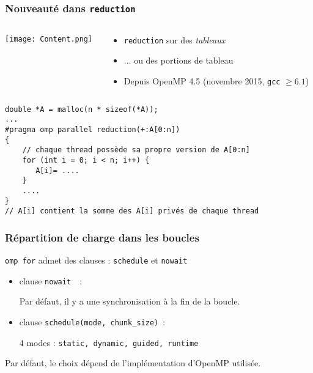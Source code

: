 \documentclass{beamer}
\begin{document}


\begin{frame}[fragile]
  \frametitle{Nouveauté dans \texttt{reduction}}

  \begin{columns}[b]
    \begin{column}{.1\textwidth}
      \texttt{[image: Content.png]}
    \end{column}
    \begin{column}{.9\textwidth}
      \begin{itemize}
      \item \texttt{reduction} sur des \emph{tableaux}
      \item ... ou des portions de tableau
      \item Depuis OpenMP 4.5 (novembre 2015, \texttt{gcc} $\geq 6.1$)
      \end{itemize}
    \end{column}
  \end{columns}

\bigskip
  
\begin{verbatim}
double *A = malloc(n * sizeof(*A));
...
#pragma omp parallel reduction(+:A[0:n])
{
    // chaque thread possède sa propre version de A[0:n]
    for (int i = 0; i < n; i++) {
       A[i]= ....
    }
    ....
}
// A[i] contient la somme des A[i] privés de chaque thread 
\end{verbatim} 
\end{frame}



\begin{frame}
  \frametitle{Répartition de charge dans les boucles}
  
  \texttt{omp for} admet des clauses : {\tt schedule} et {\tt  nowait}
  
\bigskip
\begin{itemize}
\item clause {\tt nowait }~:

  Par défaut, il y a une synchronisation à la fin de la boucle.
  
\bigskip
\item clause {\tt schedule(mode, chunk\_size)}~:
  
  4 modes : {\tt static, dynamic, guided, runtime}
\end{itemize}
\bigskip
  Par défaut, le choix dépend de l'implémentation d'OpenMP utilisée.
\end{frame}
\end{document}
